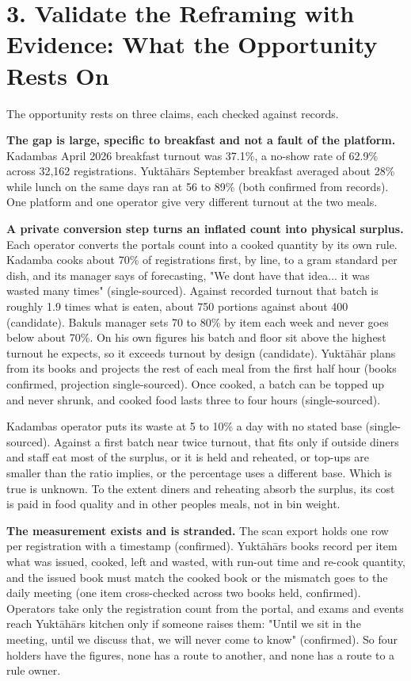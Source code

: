 \documentclass[
  10pt,
  table]{article}
\begin{document}
\section{3. Validate the Reframing with Evidence: What the Opportunity Rests On}\label{validate-the-reframing-with-evidence-what-the-opportunity-rests-on}

The opportunity rests on three claims, each checked against records.

\textbf{The gap is large, specific to breakfast and not a fault of the platform.} Kadamba\textquotesingle s April 2026 breakfast turnout was 37.1\%, a no-show rate of 62.9\% across 32,162 registrations. Yuktāhār\textquotesingle s September breakfast averaged about 28\% while lunch on the same days ran at 56 to 89\% (both confirmed from records). One platform and one operator give very different turnout at the two meals.

\textbf{A private conversion step turns an inflated count into physical surplus.} Each operator converts the portal\textquotesingle s count into a cooked quantity by its own rule. Kadamba cooks about 70\% of registrations first, by line, to a gram standard per dish, and its manager says of forecasting, "We don\textquotesingle t have that idea... it was wasted many times" (single-sourced). Against recorded turnout that batch is roughly 1.9 times what is eaten, about 750 portions against about 400 (candidate). Bakul\textquotesingle s manager sets 70 to 80\% by item each week and never goes below about 70\%. On his own figures his batch and floor sit above the highest turnout he expects, so it exceeds turnout by design (candidate). Yuktāhār plans from its books and projects the rest of each meal from the first half hour (books confirmed, projection single-sourced). Once cooked, a batch can be topped up and never shrunk, and cooked food lasts three to four hours (single-sourced).

Kadamba\textquotesingle s operator puts its waste at 5 to 10\% a day with no stated base (single-sourced). Against a first batch near twice turnout, that fits only if outside diners and staff eat most of the surplus, or it is held and reheated, or top-ups are smaller than the ratio implies, or the percentage uses a different base. Which is true is unknown. To the extent diners and reheating absorb the surplus, its cost is paid in food quality and in other people\textquotesingle s meals, not in bin weight.

\textbf{The measurement exists and is stranded.} The scan export holds one row per registration with a timestamp (confirmed). Yuktāhār\textquotesingle s books record per item what was issued, cooked, left and wasted, with run-out time and re-cook quantity, and the issued book must match the cooked book or the mismatch goes to the daily meeting (one item cross-checked across two books held, confirmed). Operators take only the registration count from the portal, and exams and events reach Yuktāhār\textquotesingle s kitchen only if someone raises them: "Until we sit in the meeting, until we discuss that, we will never come to know" (confirmed). So four holders have the figures, none has a route to another, and none has a route to a rule owner.
\end{document}
